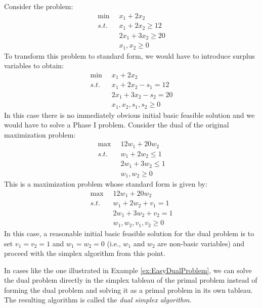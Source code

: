 \begin{example}
Consider the problem:
\begin{displaymath}
\begin{aligned}
\min\;\; & 	x_1 + 2x_2\\
s.t.\;\; &	x_1 + 2x_2 \geq 12\\
		 &	2x_1 + 3x_2 \geq 20\\
		 &	x_1, x_2 \geq 0
\end{aligned}
\end{displaymath}
To transform this problem to standard form, we would have to introduce surplus variables to obtain:
\begin{displaymath}
\begin{aligned}
\min\;\; & 	x_1 + 2x_2\\
s.t.\;\; &	x_1 + 2x_2 - s_1 = 12\\
		 &	2x_1 + 3x_2 - s_2 = 20\\
		 &	x_1, x_2, s_1, s_2 \geq 0
\end{aligned}
\end{displaymath}
In this case there is no immediately obvious initial basic feasible solution and we would have to solve a Phase I problem. Consider the dual of the original maximization problem:
\begin{displaymath}
\begin{aligned}
\max\;\;&12 w_1 + 20w_2\\
s.t.\;\; & w_1 + 2w_2 \leq 1\\
& 2w_1 + 3w_2 \leq 1\\
& w_1,w_2 \geq 0
\end{aligned}
\end{displaymath}
This is a maximization problem whose standard form is given by:
\begin{displaymath}
\begin{aligned}
\max\;\;&12 w_1 + 20w_2\\
s.t.\;\; & w_1 + 2w_2 + v_1 = 1\\
& 2w_1 + 3w_2 + v_2 = 1\\
& w_1,w_2,v_1,v_2 \geq 0
\end{aligned}
\end{displaymath}
In this case, a reasonable initial basic feasible solution for the dual problem is to set $v_1 = v_2 = 1$ and $w_1 = w_2 = 0$ (i.e., $w_1$ and $w_2$ are non-basic variables) and proceed with the simplex algorithm from this point.
\label{ex:EasyDualProblem}
\end{example}

In cases like the one illustrated in Example \ref{ex:EasyDualProblem}, we can solve the dual problem directly in the simplex tableau of the primal problem instead of forming the dual problem and solving it as a primal problem in its own tableau. The resulting algorithm is called the \textit{dual simplex algorithm}. 

